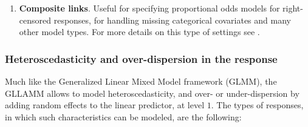 \begin{enumerate}
\begin{enumerate}
		
		\item \textbf{Composite links}. Useful for specifying proportional odds models for right-censored responses, for handling missing categorical covariates and many other model types. For more details on this type of settings see \citet{Skrondal_et_al_2004b}.
	\end{enumerate}
	
\end{enumerate}



\subsubsection{Heteroscedasticity and over-dispersion in the response} \label{ss_sect:het}

Much like the Generalized Linear Mixed Model framework (GLMM), the GLLAMM allows to model heteroscedasticity, and over- or under-dispersion by adding random effects to the linear predictor, at level $1$. The types of responses, in which such characteristics can be modeled, are the following:

